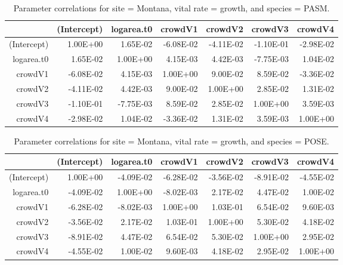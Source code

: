 \documentclass[12pt,]{article}
\begin{document}
\begin{table}[ht]
\centering
\caption{Parameter correlations for site = Montana, vital rate = growth, and species = PASM.} 
\begin{tabular}{rrrrrrr}
  \hline
 & (Intercept) & logarea.t0 & crowdV1 & crowdV2 & crowdV3 & crowdV4 \\ 
  \hline
(Intercept) & 1.00E+00 & 1.65E-02 & -6.08E-02 & -4.11E-02 & -1.10E-01 & -2.98E-02 \\ 
  logarea.t0 & 1.65E-02 & 1.00E+00 & 4.15E-03 & 4.42E-03 & -7.75E-03 & 1.04E-02 \\ 
  crowdV1 & -6.08E-02 & 4.15E-03 & 1.00E+00 & 9.00E-02 & 8.59E-02 & -3.36E-02 \\ 
  crowdV2 & -4.11E-02 & 4.42E-03 & 9.00E-02 & 1.00E+00 & 2.85E-02 & 1.31E-02 \\ 
  crowdV3 & -1.10E-01 & -7.75E-03 & 8.59E-02 & 2.85E-02 & 1.00E+00 & 3.59E-03 \\ 
  crowdV4 & -2.98E-02 & 1.04E-02 & -3.36E-02 & 1.31E-02 & 3.59E-03 & 1.00E+00 \\ 
   \hline
\end{tabular}
\end{table}

\newpage{}

\begin{table}[ht]
\centering
\caption{Parameter correlations for site = Montana, vital rate = growth, and species = POSE.} 
\begin{tabular}{rrrrrrr}
  \hline
 & (Intercept) & logarea.t0 & crowdV1 & crowdV2 & crowdV3 & crowdV4 \\ 
  \hline
(Intercept) & 1.00E+00 & -4.09E-02 & -6.28E-02 & -3.56E-02 & -8.91E-02 & -4.55E-02 \\ 
  logarea.t0 & -4.09E-02 & 1.00E+00 & -8.02E-03 & 2.17E-02 & 4.47E-02 & 1.00E-02 \\ 
  crowdV1 & -6.28E-02 & -8.02E-03 & 1.00E+00 & 1.03E-01 & 6.54E-02 & 9.60E-03 \\ 
  crowdV2 & -3.56E-02 & 2.17E-02 & 1.03E-01 & 1.00E+00 & 5.30E-02 & 4.18E-02 \\ 
  crowdV3 & -8.91E-02 & 4.47E-02 & 6.54E-02 & 5.30E-02 & 1.00E+00 & 2.95E-02 \\ 
  crowdV4 & -4.55E-02 & 1.00E-02 & 9.60E-03 & 4.18E-02 & 2.95E-02 & 1.00E+00 \\ 
   \hline
\end{tabular}
\end{table}
\end{document}
